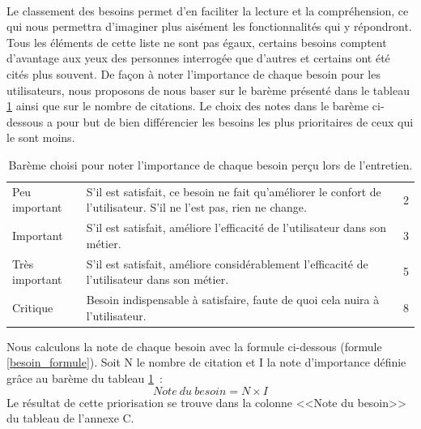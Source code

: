 			\paragraph{}%
			Le classement des besoins permet d'en faciliter la lecture et la
			compréhension, ce qui nous permettra d'imaginer plus aisément les
			fonctionnalités qui y répondront. Tous les éléments de cette
			liste ne sont pas égaux, certains besoins comptent d'avantage aux yeux des
			personnes interrogée que d'autres et certains ont été cités plus
			souvent.\newline
			De façon à noter l'importance de chaque besoin pour les utilisateurs, nous
			proposons de nous baser sur le barème présenté dans le tableau
			\ref{bareme_besoins} ainsi que sur le nombre de citations. Le choix des notes
			dans le barème ci-dessous a pour but
			de bien différencier les besoins les plus prioritaires de ceux qui le sont moins.
			\begin{table}[H]
				\centering
				\caption{\label{bareme_besoins} Barème choisi pour noter l'importance de
				chaque besoin perçu lors de l'entretien.}
				\begin{tabular}{| p{4cm} | p{8cm} | p{2cm} |}
					\hline
						\thead{Priorité}
						&\thead{Description}
						&\thead{Note}
						\\
					\hline
						Peu important
						&
						S'il est satisfait, ce besoin ne fait qu'améliorer le confort de l'utilisateur. S'il ne l'est pas, rien ne change.
						&
						2
						\\
					\hline
						Important
						&
						S'il est satisfait, améliore l'efficacité de l'utilisateur dans son
						métier.
						&
						3
						\\
					\hline
						Très important
						&
						S'il est satisfait, améliore considérablement l'efficacité de
						l'utilisateur dans son métier.
						&
						5
						\\
					\hline
						Critique
						&
						Besoin indispensable à satisfaire, faute de quoi cela nuira à l'utilisateur.
						&
						8
						\\
					\hline
				\end{tabular}
			\end{table}
			Nous calculons la note de chaque besoin avec la formule ci-dessous
			(formule \ref{besoin_formule}).
			Soit N le nombre de citation et I la note d'importance définie grâce au
			barème du tableau \ref{bareme_besoins}~:
			\begin{equation}
				\label{besoin_formule}
				Note\ du\ besoin=N\times I
			\end{equation}
			Le résultat de cette priorisation se trouve dans la colonne <<Note du besoin>>
			du tableau de l'annexe C.
	
